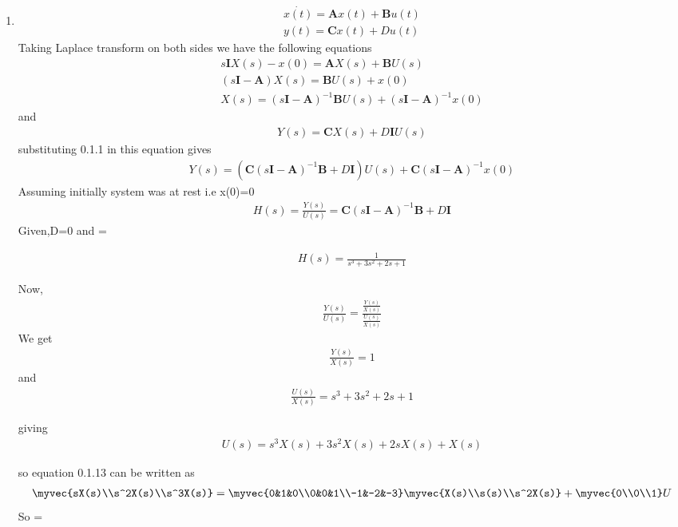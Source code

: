 \begin{enumerate}[label=\thesection.\arabic*.,ref=\thesection.\theenumi]
\item
\begin{align}
 \dot{x(t)}=\bm{A}x(t)+\bm{B}u(t) \\
 y(t)=\bm{C}x(t)+Du(t)
\end{align} 
Taking Laplace transform on both sides we have the following equations
\begin{align}
s\bm{I}X(s)-x(0)= \bm{A}X(s)+ \bm{B}U(s)\\
(s\bm{I}-\bm{A})X(s)= \bm{B}U(s)+ x(0)\\
X(s)={(s\bm{I}-\bm{A})^{-1}}\bm{B} U(s)+ (s\bm{I}-\bm{A})^{-1}x(0)
\end{align}
and
\begin{align}
Y(s)= \bm{C}X(s)+D\bm{I}U(s)
\end{align}
substituting 0.1.1 in this equation gives
\begin{align}
Y(s)=( \bm{C}{(s\bm{I}-\bm{A})^{-1}}\bm{B}+D\bm{I}) U(s) + \bm{C}(s\bm{I}-\bm{A})^{-1}x(0)
\end{align}
Assuming initially system was at rest i.e x(0)=0
\begin{align}
H(s)= {\frac{Y(s)}{U(s)}}= \bm{C}{(s\bm{I}-\bm{A})^{-1}}\bm{B}+D\bm{I}
\end{align}
Given,D=0 and = {}

\begin{align}
H(s)=\frac{1}{s^3 + 3s^2+2s + 1}
\end{align}

Now, 
\begin{align} 
{\frac{Y(s)}{U(s)}}= {\frac{\frac{Y(s)}{X(s)}}{\frac{U(s)}{X(s)}}}  
\end{align}
We get
\begin{align}
 {\frac{Y(s)}{X(s)}}= 1
\end{align}
and
\begin{align}
{\frac{U(s)}{X(s)}}={s^3 + 3s^2+2s + 1}
\end{align}

giving
\begin{align}
U(s)= s^3 X(s) + 3s^2 X(s)+2sX(s) + X(s)
\end{align}

so equation 0.1.13 can be written as
\begin{align}
\myvec{sX(s)\\s^2X(s)\\s^3X(s)}
=
\myvec{0&1&0\\0&0&1\\-1&-2&-3}\myvec{X(s)\\s(s)\\s^2X(s)}
+
\myvec{0\\0\\1}  U
\end{align}
So =


\end{enumerate}
